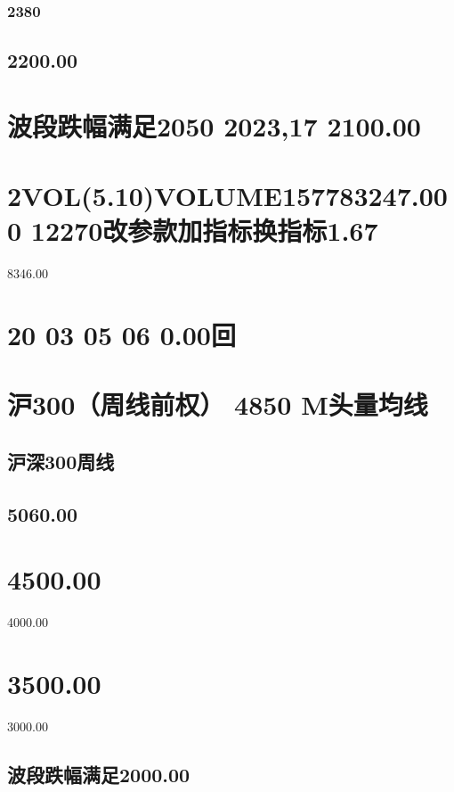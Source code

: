 \documentclass{article}
\begin{document}
\subsubsection{2380}

\subsection{2200.00}

\section{波段跌幅满足2050 2023,17 2100.00}

\section{2VOL(5.10)VOLUME157783247.000 12270改参款加指标换指标1.67}

8346.00

\section{20 03 05 06 0.00回}

\section{沪300（周线前权） 4850 M头量均线}

\subsection{沪深300周线}

\subsection{5060.00}

\section{4500.00}

4000.00

\section{3500.00}

3000.00

\subsection{波段跌幅满足2000.00}
\end{document}
